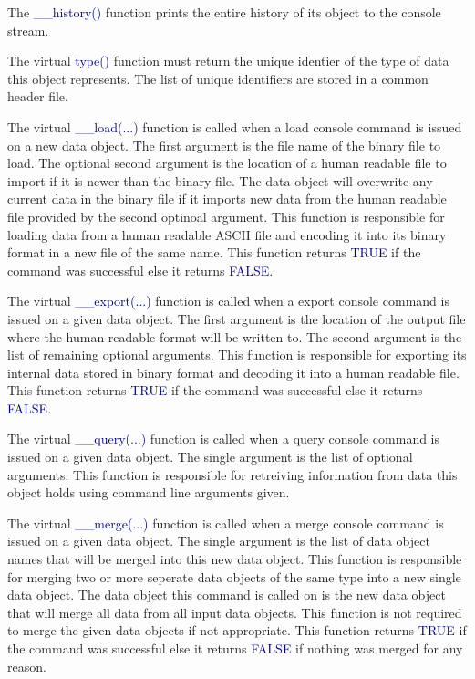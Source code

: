 \documentclass[10pt]{article}
\providecommand{\h}[1]{\textcolor{darkblue}{#1}}
\begin{document}
The \h{\_\_history()} function prints the entire history of its object to 
the console stream.

The virtual \h{type()} function must return the unique identier of the type of 
data this object represents. The list of unique identifiers are stored in a 
common header file.

The virtual \h{\_\_load(...)} function is called when a load console command 
is issued on a new data object. The first argument is the file name of the 
binary file to load. The optional second argument is the location of a human 
readable file to import if it is newer than the binary file. The data object 
will overwrite any current data in the binary file if it imports new data from 
the human readable file provided by the second optinoal argument. This 
function is responsible for loading data from a human readable ASCII file and 
encoding it into its binary format in a new file of the same name. This 
function returns \h{TRUE} if the command was successful else it returns 
\h{FALSE}.

The virtual \h{\_\_export(...)} function is called when a export console command 
is issued on a given data object. The first argument is the location of the 
output file where the human readable format will be written to. The second 
argument is the list of remaining optional arguments. This function is 
responsible for exporting its internal data stored in binary format and decoding 
it into a human readable file. This function returns \h{TRUE} if the command was 
successful else it returns \h{FALSE}.

The virtual \h{\_\_query(...)} function is called when a query console command 
is issued on a given data object. The single argument is the list of optional 
arguments. This function is responsible for retreiving information from 
data this object holds using command line arguments given.

The virtual \h{\_\_merge(...)} function is called when a merge console command 
is issued on a given data object. The single argument is the list of data 
object names that will be merged into this new data object. This function is 
responsible for merging two or more seperate data objects of the same type into 
a new single data object. The data object this command is called on is the new 
data object that will merge all data from all input data objects. This function 
is not required to merge the given data objects if not appropriate. This 
function returns \h{TRUE} if the command was successful else it returns 
\h{FALSE} if nothing was merged for any reason.
\end{document}
